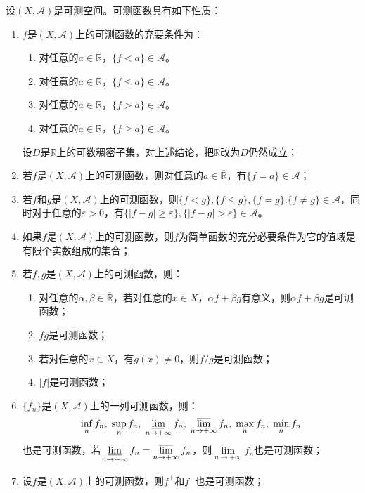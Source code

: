 \begin{property}\label{prop:MeasurableFunction}
	设$(X,\mathscr{A})$是可测空间。可测函数具有如下性质：
	\begin{enumerate}
		\item $f$是$(X,\mathscr{A})$上的可测函数的充要条件为：
		\begin{enumerate}
			\item 对任意的$a\in\mathbb{R}$，$\{f<a\}\in\mathscr{A}$。
			\item 对任意的$a\in\mathbb{R}$，$\{f\leqslant a\}\in\mathscr{A}$。
			\item 对任意的$a\in\mathbb{R}$，$\{f>a\}\in\mathscr{A}$。
			\item 对任意的$a\in\mathbb{R}$，$\{f\geqslant a\}\in\mathscr{A}$。
		\end{enumerate}
		设$D$是$\mathbb{R}$上的可数稠密子集，对上述结论，把$\mathbb{R}$改为$D$仍然成立；
		\item 若$f$是$(X,\mathscr{A})$上的可测函数，则对任意的$a\in\overline{\mathbb{R}}$，有$\{f=a\}\in\mathscr{A}$；
		\item 若$f$和$g$是$(X,\mathscr{A})$上的可测函数，则$\{f<g\},\{f\leqslant g\},\{f=g\}.\{f\ne g\}\in\mathscr{A}$，同时对于任意的$\varepsilon>0$，有$\{|f-g|\geqslant\varepsilon\},\{|f-g|>\varepsilon\}\in\mathscr{A}$。
		\item 如果$f$是$(X,\mathscr{A})$上的可测函数，则$f$为简单函数的充分必要条件为它的值域是有限个实数组成的集合；
		\item 若$f,g$是$(X,\mathscr{A})$上的可测函数，则：
		\begin{enumerate}
			\item 对任意的$\alpha,\beta\in\overline{\mathbb{R}}$，若对任意的$x\in X$，$\alpha f+\beta g$有意义，则$\alpha f+\beta g$是可测函数；
			\item $fg$是可测函数；
			\item 若对任意的$x\in X$，有$g(x)\ne0$，则$f/g$是可测函数；
			\item $|f|$是可测函数；
		\end{enumerate}
		\item $\{f_n\}$是$(X,\mathscr{A})$上的一列可测函数，则：
		\begin{equation*}
			\inf_nf_n,\;\sup_nf_n,\;
			\varliminf_{n\to+\infty}f_n,\;\varlimsup_{n\to+\infty}f_n,\;\max_nf_n,\;\min_nf_n
		\end{equation*}
		也是可测函数，若$\varliminf\limits_{n\to+\infty}f_n=\varlimsup\limits_{n\to+\infty}f_n$，则$\lim\limits_{n\to+\infty}f_n$也是可测函数；
		\item 设$f$是$(X,\mathscr{A})$上的可测函数，则$f^+$和$f^-$也是可测函数；

\end{enumerate}
\end{property}
